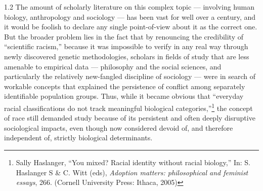\documentclass[../unravbook.tex]{subfiles}
\begin{document}
\begin{spacing}{1.2}
The amount of scholarly literature on this complex topic --- involving human biology, anthropology and sociology --- has been vast for well over a century, and it would be foolish to declare any single point-of-view about it as the correct one. But the broader problem lies in the fact that by renouncing the credibility of \enquote{scientific racism,} because it was impossible to verify in any real way through newly discovered genetic methodologies, scholars in fields of study that are less amenable to empirical data --- philosophy and the social sciences, and particularly the relatively new-fangled discipline of sociology --- were in search of workable concepts that explained the persistence of conflict among separately identifiable population groups. Thus, while it became obvious that \enquote{everyday racial classifications do not track meaningful biological categories,}\footnote{Sally Haslanger, ``You mixed? Racial identity without racial biology,'' In: S. Haslanger S \& C. Witt (eds), \textit{Adoption matters: philosophical and feminist essays}, 266. (Cornell University Press: Ithaca, 2005)} the concept of race still demanded study because of its persistent and often deeply disruptive sociological impacts, even though now considered devoid of, and therefore independent of, strictly biological determinants. 


\end{spacing}
\end{document}
